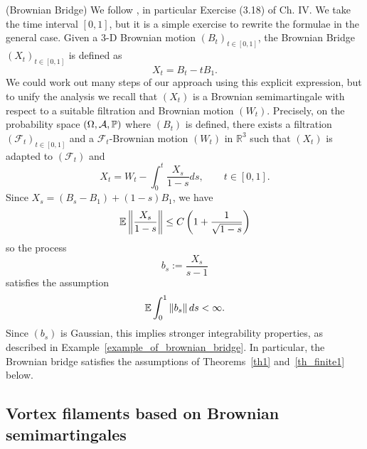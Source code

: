 \begin{example}
(Brownian Bridge) We follow \cite{R-Y}, in particular Exercise (3.18) of Ch.
IV. We take the time interval $\left[ 0,1\right] $, but it is a simple
exercise to rewrite the formulae in the general case. Given a $3$-D Brownian
motion $\left( B_{t}\right) _{t\in \left[ 0,1\right] }$, the Brownian Bridge 
$\left( X_{t} \right) _{t\in \left[ 0,1\right] }$ 
is defined as 
\begin{equation*}
X_{t} = B_{t}-tB_{1}.
\end{equation*}
We could work out many steps of our approach using this explicit expression,
but to unify the analysis we recall that $\left( X_{t} \right) $ is a
Brownian semimartingale with respect to a suitable filtration and Brownian
motion $\left( W_{t}\right) $. Precisely, on the probability space
$(\Omega, \mathcal{A}, \operatorname{{\mathbb P}})$ where $(B_t)$ is defined, there exists a
filtration $(\mathcal{F}_t)_{t\in [0,1]}$ and a $\mathcal{F}_t$-Brownian motion
$(W_t)$ in $\mathbb{R}^3$ such that $(X_t)$ is adapted to
$(\mathcal{F}_t)$ and 
\begin{equation*}
X_{t} =W_{t}-\int_{0}^{t}\frac{X_{s}}{1-s}ds, 
\qquad t\in %
\left[ 0,1 \right] .
\end{equation*}
Since $X_{s} = \left( B_{s}-B_{1}\right) +\left(
1-s\right) B_{1}$, we have
\begin{equation*}
\operatorname{{\mathbb E}} \left\| \frac{X_{s}}{1-s}\right\| 
\leq C\left( 1+\frac{1}{\sqrt{1-s}}\right) 
\end{equation*}
so the process 
\begin{equation*}
b_{s}:=\frac{X_{s}}{s-1}
\end{equation*}
satisfies the assumption
\begin{equation*}
\operatorname{{\mathbb E}} \int_{0}^{1}\left\| b_{s}\right\| ds <\infty
.
\end{equation*}
Since $(b_s)$ is Gaussian, this implies stronger integrability
properties, as described in Example~\ref{example_of_brownian_bridge}. 
In particular, the Brownian
bridge satisfies the assumptions of Theorems~\ref{th1} and~\ref{th_finite1} below.

\end{example}

\subsection{Vortex filaments based on Brownian semimartingales}

